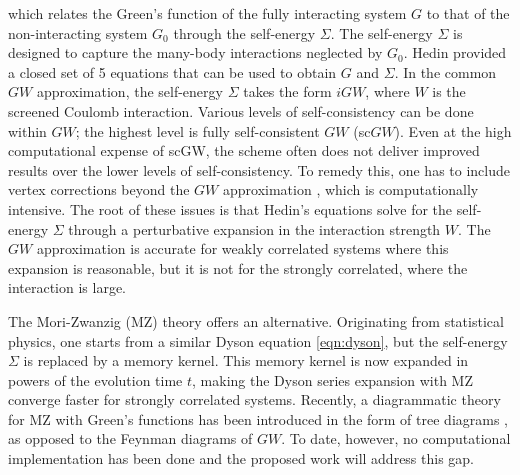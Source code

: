 which relates the Green's function of the fully interacting system \( G \) to that of the non-interacting system \( G_0 \) through the self-energy \( \Sigma \). The self-energy \( \Sigma \) is designed to capture the many-body interactions neglected by \( G_0 \). Hedin provided a closed set of 5 equations that can be used to obtain \( G \) and \( \Sigma \). In the common \( GW \) approximation, the self-energy \( \Sigma \) takes the form \( iGW \), where \( W \) is the screened Coulomb interaction. Various levels of self-consistency can be done within \( GW \); the highest level is fully self-consistent \( GW \) (sc\( GW \)). Even at the high computational expense of scGW, the scheme often does not deliver improved results over the lower levels of self-consistency. To remedy this, one has to include vertex corrections beyond the \( GW \) approximation \cite{kutepov_one-electron_2017}, which is computationally intensive. The root of these issues is that Hedin's equations solve for the self-energy \( \Sigma \) through a perturbative expansion in the interaction strength \( W \). The \( GW \) approximation is accurate for weakly correlated systems where this expansion is reasonable, but it is not for the strongly correlated, where the interaction is large.

The Mori-Zwanzig (MZ) theory offers an alternative. Originating from statistical physics, one starts from a similar Dyson equation \ref{eqn:dyson}, but the self-energy \( \Sigma \) is replaced by a memory kernel. This memory kernel is now expanded in powers of the evolution time \( t \), making the Dyson series expansion with MZ converge faster for strongly correlated systems. Recently, a diagrammatic theory for MZ with Green's functions has been introduced in the form of tree diagrams \cite{zhu_combinatorial_2022}, as opposed to the Feynman diagrams of \( GW \). To date, however, no computational implementation has been done and the proposed work will address this gap.
